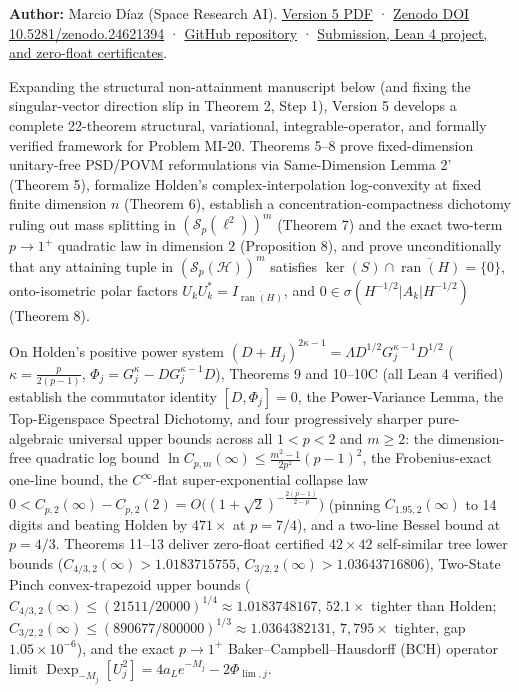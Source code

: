 \documentclass[11pt,a4paper]{article}
\begin{document}
\textbf{Author:} Marcio Díaz (Space Research AI).
\href{https://github.com/ajt60gaibb/OpenProblemsInNLA/blob/main/references/diaz-mi20-v5-2026-11-28/mi20_subquadratic_lee_whitepaper.pdf}{Version
5 PDF} · \href{https://doi.org/10.5281/zenodo.24621394}{Zenodo DOI
10.5281/zenodo.24621394} ·
\href{https://github.com/spaceresearchai/mi20-subquadratic-lee}{GitHub
repository} ·
\href{https://github.com/ajt60gaibb/OpenProblemsInNLA/blob/main/references/diaz-mi20-v5-2026-11-28/README.md}{Submission,
Lean 4 project, and zero-float certificates}.

Expanding the structural non-attainment manuscript below (and fixing the
singular-vector direction slip in Theorem 2, Step 1), Version 5 develops
a complete 22-theorem structural, variational, integrable-operator, and
formally verified framework for Problem MI-20. Theorems 5--8 prove
fixed-dimension unitary-free PSD/POVM reformulations via Same-Dimension
Lemma 2' (Theorem 5), formalize Holden's complex-interpolation
log-convexity at fixed finite dimension \(n\) (Theorem 6), establish a
concentration-compactness dichotomy ruling out mass splitting in
\((\mathcal{S}_p(\ell^2))^m\) (Theorem 7) and the exact two-term
\(p \to 1^+\) quadratic law in dimension \(2\) (Proposition 8), and
prove unconditionally that any attaining tuple in
\((\mathcal{S}_p(\mathcal{H}))^m\) satisfies
\(\ker(S) \cap \overline{\mathop{\mathrm{ran}}\nolimits(H)} = \{0\}\),
onto-isometric polar factors
\(U_k U_k^* = I_{\overline{\mathop{\mathrm{ran}}\nolimits(H)}}\), and
\(0 \in \sigma(H^{-1/2}|A_k|H^{-1/2})\) (Theorem 8).

On Holden's positive power system
\((D + H_j)^{2\kappa-1} = \Lambda D^{1/2} G_j^{\kappa-1} D^{1/2}\)
(\(\kappa = \frac{p}{2(p-1)}\),
\(\Phi_j = G_j^\kappa - D G_j^{\kappa-1} D\)), Theorems 9 and 10--10C
(all Lean 4 verified) establish the commutator identity
\([D, \Phi_j] = 0\), the Power-Variance Lemma, the Top-Eigenspace
Spectral Dichotomy, and four progressively sharper pure-algebraic
universal upper bounds across all \(1 < p < 2\) and \(m \ge 2\): the
dimension-free quadratic log bound
\(\ln C_{p,m}(\infty) \le \frac{m^2-1}{2p^2}(p-1)^2\), the
Frobenius-exact one-line bound, the \(C^\infty\)-flat super-exponential
collapse law
\(0 < C_{p,2}(\infty) - C_{p,2}(2) = O\bigl((1+\sqrt{2})^{-\frac{2(p-1)}{2-p}}\bigr)\)
(pinning \(C_{1.95,2}(\infty)\) to 14 digits and beating Holden by
\(471\times\) at \(p = 7/4\)), and a two-line Bessel bound at
\(p = 4/3\). Theorems 11--13 deliver zero-float certified \(42\times 42\)
self-similar tree lower bounds (\(C_{4/3,2}(\infty) > 1.0183715755\),
\(C_{3/2,2}(\infty) > 1.03643716806\)), Two-State Pinch convex-trapezoid
upper bounds (\(C_{4/3,2}(\infty) \le (21511/20000)^{1/4} \approx 1.0183748167\),
\(52.1\times\) tighter than Holden;
\(C_{3/2,2}(\infty) \le (890677/800000)^{1/3} \approx 1.0364382131\),
\(7{,}795\times\) tighter, gap \(1.05\times 10^{-6}\)), and the exact
\(p \to 1^+\) Baker--Campbell--Hausdorff (BCH) operator limit
\(\mathop{\mathrm{Dexp}}\nolimits_{-M_j}[U_j^2] = 4a_L e^{-M_j} - 2\Phi_{\lim,j}\).
\end{document}
